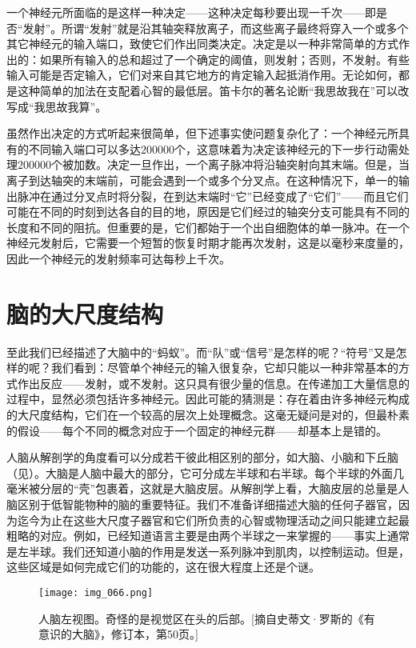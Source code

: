 一个神经元所面临的是这样一种决定——这种决定每秒要出现一千次——即是否“发射”。所谓“发射”就是沿其轴突释放离子，而这些离子最终将穿入一个或多个其它神经元的输入端口，致使它们作出同类决定。决定是以一种非常简单的方式作出的：如果所有输入的总和超过了一个确定的阈值，则发射；否则，不发射。有些输入可能是否定输入，它们对来自其它地方的肯定输入起抵消作用。无论如何，都是这种简单的加法在支配着心智的最低层。笛卡尔的著名论断“我思故我在”可以改写成“我思故我算”。

虽然作出决定的方式听起来很简单，但下述事实使问题复杂化了：一个神经元所具有的不同输入端口可以多达$200000$个，这意味着为决定该神经元的下一步行动需处理$200000$个被加数。决定一旦作出，一个离子脉冲将沿轴突射向其末端。但是，当离子到达轴突的末端前，可能会遇到一个或多个分叉点。在这种情况下，单一的输出脉冲在通过分叉点时将分裂，在到达末端时“它”已经变成了“它们”——而且它们可能在不同的时刻到达各自的目的地，原因是它们经过的轴突分支可能具有不同的长度和不同的阻抗。但重要的是，它们都始于一个出自细胞体的单一脉冲。在一个神经元发射后，它需要一个短暂的恢复时期才能再次发射，这是以毫秒来度量的，因此一个神经元的发射频率可达每秒上千次。

\section{脑的大尺度结构}

至此我们已经描述了大脑中的“蚂蚁”。而“队”或“信号”是怎样的呢？“符号”又是怎样的呢？我们看到：尽管单个神经元的输入很复杂，它却只能以一种非常基本的方式作出反应——发射，或不发射。这只具有很少量的信息。在传递加工大量信息的过程中，显然必须包括许多神经元。因此可能的猜测是：存在着由许多神经元构成的大尺度结构，它们在一个较高的层次上处理概念。这毫无疑问是对的，但最朴素的假设——每个不同的概念对应于一个固定的神经元群——却基本上是错的。

人脑从解剖学的角度看可以分成若干彼此相区别的部分，如大脑、小脑和下丘脑（见）。大脑是人脑中最大的部分，它可分成左半球和右半球。每个半球的外面几毫米被分层的“壳”包裹着，这就是大脑皮层。从解剖学上看，大脑皮层的总量是人脑区别于低智能物种的脑的重要特征。我们不准备详细描述大脑的任何子器官，因为迄今为止在这些大尺度子器官和它们所负责的心智或物理活动之间只能建立起最粗略的对应。例如，已经知道语言主要是由两个半球之一来掌握的——事实上通常是左半球。我们还知道小脑的作用是发送一系列脉冲到肌肉，以控制运动。但是，这些区域是如何完成它们的功能的，这在很大程度上还是个谜。

\begin{figure}
\texttt{[image: img\_066.png]}
\caption[人脑左视阁。]
  {人脑左视图。奇怪的是视觉区在头的后部。[摘自史蒂文·罗斯的《有意识的大脑》，修订本，第50页。]}
\end{figure}

